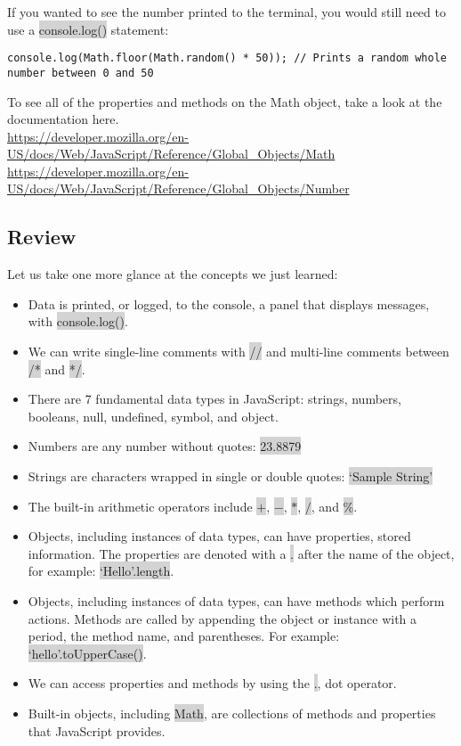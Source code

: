 \documentclass[11pt]{article}
\begin{document}
If you wanted to see the number printed to the terminal, you would still need to use a \colorbox{lightgray}{console.log()} statement:
\begin{lstlisting}
console.log(Math.floor(Math.random() * 50)); // Prints a random whole number between 0 and 50
\end{lstlisting}
To see all of the properties and methods on the Math object, take a look at the documentation here. \\
\underline{https://developer.mozilla.org/en-US/docs/Web/JavaScript/Reference/Global\_Objects/Math} \\
\underline{https://developer.mozilla.org/en-US/docs/Web/JavaScript/Reference/Global\_Objects/Number}
\subsection{Review}
Let us take one more glance at the concepts we just learned:
\begin{itemize}[leftmargin = *]
\item Data is printed, or logged, to the console, a panel that displays messages, with \colorbox{lightgray}{console.log()}.
\item We can write single-line comments with \colorbox{lightgray}{//} and multi-line comments between \colorbox{lightgray}{/*} and \colorbox{lightgray}{*/}.
\item There are 7 fundamental data types in JavaScript: strings, numbers, booleans, null, undefined, symbol, and object.
\item Numbers are any number without quotes: \colorbox{lightgray}{23.8879}
\item Strings are characters wrapped in single or double quotes: \colorbox{lightgray}{`Sample String'}
\item The built-in arithmetic operators include \colorbox{lightgray}{$+$}, \colorbox{lightgray}{$-$}, \colorbox{lightgray}{$*$}, \colorbox{lightgray}{$/$}, and \colorbox{lightgray}{$\%$}.
\item Objects, including instances of data types, can have properties, stored information. The properties are denoted with a \colorbox{lightgray}{.} after the name of the object, for example: \colorbox{lightgray}{`Hello'.length}.
\item Objects, including instances of data types, can have methods which perform actions. Methods are called by appending the object or instance with a period, the method name, and parentheses. For example: \colorbox{lightgray}{`hello'.toUpperCase()}.
\item We can access properties and methods by using the \colorbox{lightgray}{.}, dot operator.
\item Built-in objects, including \colorbox{lightgray}{Math}, are collections of methods and properties that JavaScript provides.
\end{itemize}
\end{document}
